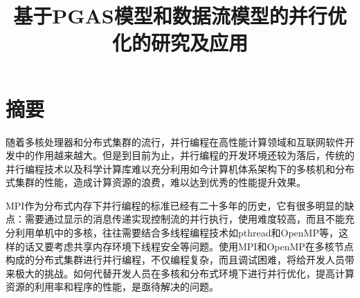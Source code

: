 \confidential{}%
\title{基于PGAS模型和数据流模型的并行优化的研究及应用}%
\maketitle
\makeenglishtitle
\makedeclaration
\chapter*{摘\quad 要}
\setcounter{page}{1}%

随着多核处理器和分布式集群的流行，并行编程在高性能计算领域和互联网软件开发中的作用越来越大。但是到目前为止，并行编程的开发环境还较为落后，传统的并行编程技术以及科学计算库难以充分利用如今计算机体系架构下的多核机和分布式集群的性能，造成计算资源的浪费，难以达到优秀的性能提升效果。

MPI作为分布式内存下并行编程的标准已经有二十多年的历史，它有很多明显的缺点：需要通过显示的消息传递实现控制流的并行执行，使用难度较高，而且不能充分利用单机中的多核，往往需要结合多线程编程技术如pthread和OpenMP等，这样的话又要考虑共享内存环境下线程安全等问题。使用MPI和OpenMP在多核节点构成的分布式集群进行并行编程，不仅编程复杂，而且调试困难，将给开发人员带来极大的挑战。如何代替开发人员在多核和分布式环境下进行并行优化，提高计算资源的利用率和程序的性能，是亟待解决的问题。


